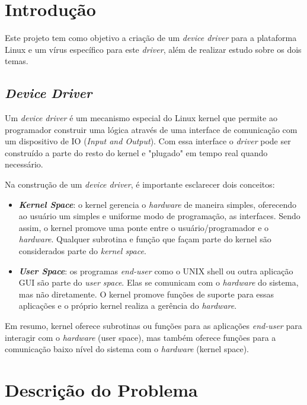 \section{Introdução}

Este projeto tem como objetivo a criação de um \textit{device driver} para a
plataforma Linux e um vírus específico para este \textit{driver}, além de 
realizar estudo sobre os dois temas.

\subsection{\textit{Device Driver}}

Um \textit{device driver} é um mecanismo especial do Linux kernel que permite
ao programador construir uma lógica através de uma interface de comunicação
com um dispositivo de IO (\textit{Input and Output}). Com essa interface
o \textit{driver} pode ser construído a parte do resto do kernel e "plugado" em tempo
real quando necessário.

Na construção de um \textit{device driver}, é importante esclarecer dois conceitos:
\begin{itemize}
  \item \textit{\textbf{Kernel Space}}: o kernel gerencia o \textit{hardware} de maneira simples, oferecendo
    ao usuário um simples e uniforme modo de programação, as interfaces. Sendo assim,
    o kernel promove uma ponte entre o usuário/programador e o \textit{hardware}. Qualquer
    subrotina e função que façam parte do kernel são considerados parte do \textit{kernel space}.

  \item \textit{\textbf{User Space}}: os programas \textit{end-user} como o UNIX shell ou outra aplicação GUI são
    parte do \textit{user space}. Elas se comunicam com o \textit{hardware} do sistema, mas não diretamente.
    O kernel promove funções de suporte para essas aplicações e o próprio kernel realiza
    a gerência do \textit{hardware}.

\end{itemize}

Em resumo, kernel oferece subrotinas ou funções para as aplicações \textit{end-user} para interagir
com o \textit{hardware} (user space), mas também oferece funções para a comunicação baixo nível do sistema
com o \textit{hardware} (kernel space).

\section{Descrição do Problema}

